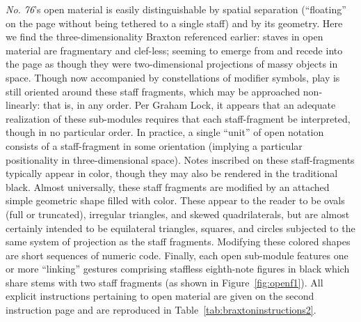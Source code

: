         \textit{No. 76}'s open material is easily distinguishable by spatial separation (``floating'' on the page without being tethered to a single staff) and by its geometry. Here we find the three-dimensionality Braxton referenced earlier: staves in open material are fragmentary and clef-less; seeming to emerge from and recede into the page as though they were two-dimensional projections of massy objects in space. Though now accompanied by constellations of modifier symbols, play is still oriented around these staff fragments, which may be approached non-linearly: that is, in any order. Per Graham Lock, it appears that an adequate realization of these sub-modules requires that each staff-fragment be interpreted, though in no particular order.\autocite[Postscript 3]{Lock_1989} In practice, a single ``unit'' of open notation consists of a staff-fragment in some orientation (implying a particular positionality in three-dimensional space). Notes inscribed on these staff-fragments typically appear in color, though they may also be rendered in the traditional black. Almost universally, these staff fragments are modified by an attached simple geometric shape filled with color. These appear to the reader to be ovals (full or truncated), irregular triangles, and skewed quadrilaterals, but are almost certainly intended to be equilateral triangles, squares, and circles subjected to the same system of projection as the staff fragments. Modifying these colored shapes are short sequences of numeric code. Finally, each open sub-module features one or more ``linking'' gestures comprising staffless eighth-note figures in black which share stems with two staff fragments (as shown in Figure~\ref{fig:openf1}). All explicit instructions pertaining to open material are given on the second instruction page and are reproduced in Table~\ref{tab:braxtoninstructions2}. 

